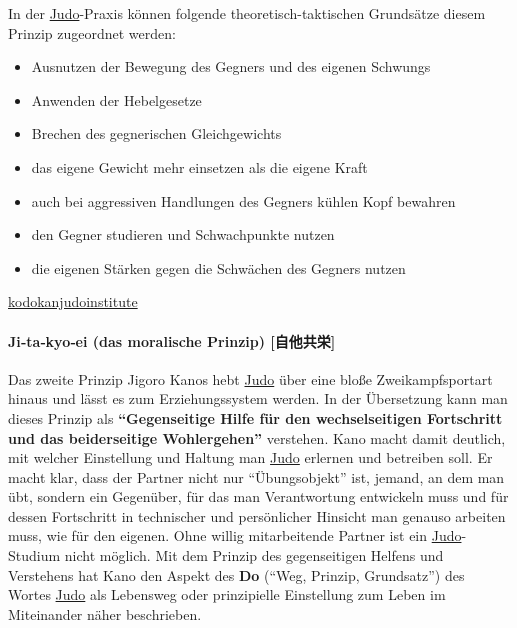 \documentclass[justified, a4paper, notitlepage, captions=tableheading, nobib]{tufte-handout}
\begin{document}
In der \hyperref[org4f88021]{Judo}-Praxis können folgende theoretisch-taktischen Grundsätze diesem Prinzip zugeordnet werden: 
\begin{itemize}
\item Ausnutzen der Bewegung des Gegners und des eigenen Schwungs
\item Anwenden der Hebelgesetze
\item Brechen des gegnerischen Gleichgewichts
\item das eigene Gewicht mehr einsetzen als die eigene Kraft
\item auch bei aggressiven Handlungen des Gegners kühlen Kopf bewahren
\item den Gegner studieren und Schwachpunkte nutzen
\item die eigenen Stärken gegen die Schwächen des Gegners nutzen
\end{itemize}

\href{http://kodokanjudoinstitute.org/en/doctrine/word/seiryoku-zenyo/}{kodokanjudoinstitute}

\paragraph{Ji‐ta‐kyo‐ei (das moralische Prinzip) [自他共栄]}
\label{sec:orge877fd8}
Das zweite Prinzip Jigoro Kanos hebt \hyperref[org4f88021]{Judo} über eine bloße Zweikampfsportart hinaus und lässt es zum Erziehungssystem werden. In der Übersetzung kann man dieses Prinzip als \textbf{"`Gegenseitige Hilfe für den wechselseitigen Fortschritt und das beiderseitige Wohlergehen"'} verstehen. Kano macht damit deutlich, mit welcher Einstellung und Haltung man \hyperref[org4f88021]{Judo} erlernen und betreiben soll. Er macht klar, dass der Partner nicht nur "`Übungsobjekt"' ist, jemand, an dem man übt, sondern ein Gegenüber, für das man Verantwortung entwickeln muss und für dessen Fortschritt in technischer und persönlicher Hinsicht man genauso arbeiten muss, wie für den eigenen. Ohne willig mitarbeitende Partner ist ein \hyperref[org4f88021]{Judo}-Studium nicht möglich. Mit dem Prinzip des gegenseitigen Helfens und Verstehens hat Kano den Aspekt des \textbf{Do} ("`Weg, Prinzip, Grundsatz"') des Wortes \hyperref[org4f88021]{Judo} als Lebensweg oder prinzipielle Einstellung zum Leben im Miteinander näher beschrieben. 
\end{document}

